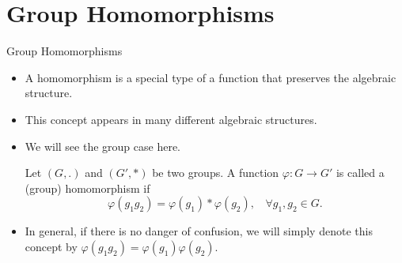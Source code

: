 \documentclass[ %
 10pt, xcolor={dvipsnames,svgnames,x11names,hyperref},
   hyperref={colorlinks=true,citecolor=green,linkcolor=DarkRed,urlcolor=ProcessBlue,anchorcolor=blue}
  ]{beamer}
\newenvironment{stepitemize}{\begin{itemize}[<+->]}{\end{itemize} }
\begin{document}
\section{Group Homomorphisms}
\begin{frame}{Group Homomorphisms}
\begin{stepitemize}
    \item A homomorphism is a special type of a function that preserves the algebraic structure.
    \item This concept appears in many different algebraic structures.
    \item We will see the group case here.
    \begin{definition}
    Let $(G,.)$ and $(G',*)$ be two groups. A function $\varphi:G\rightarrow G'$ is called a (group) homomorphism if 
$$\varphi(g_1g_2) = \varphi(g_1)*\varphi(g_2), \:\:\:\: \forall g_1, g_2 \in G.$$
    \end{definition}
\item In general, if there is no danger of confusion, we will simply denote this concept by 
$\varphi(g_1g_2) = \varphi(g_1)\varphi(g_2)$.
\end{stepitemize}
    
\end{frame}
\end{document}
